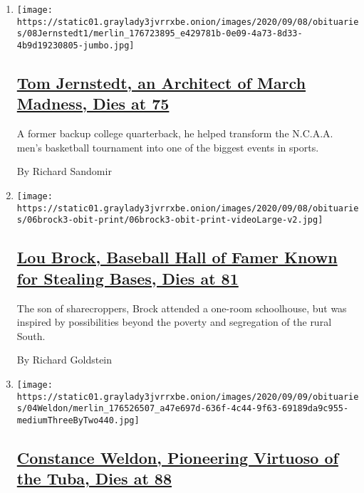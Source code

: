 \begin{enumerate}
\def\labelenumi{\arabic{enumi}.}
\item
  \texttt{[image: https://static01.graylady3jvrrxbe.onion/images/2020/09/08/obituaries/08Jernstedt1/merlin\_176723895\_e429781b-0e09-4a73-8d33-4b9d19230805-jumbo.jpg]}

  \hypertarget{tom-jernstedt-an-architect-of-march-madness-dies-at-75}{%
  \subsection{\texorpdfstring{\href{/2020/09/08/sports/ncaabasketball/tom-jernstedt-dead.html}{Tom
  Jernstedt, an Architect of March Madness, Dies at
  75}}{Tom Jernstedt, an Architect of March Madness, Dies at 75}}\label{tom-jernstedt-an-architect-of-march-madness-dies-at-75}}

  A former backup college quarterback, he helped transform the N.C.A.A.
  men's basketball tournament into one of the biggest events in sports.

  By Richard Sandomir
\item
  \texttt{[image: https://static01.graylady3jvrrxbe.onion/images/2020/09/08/obituaries/06brock3-obit-print/06brock3-obit-print-videoLarge-v2.jpg]}

  \hypertarget{lou-brock-baseball-hall-of-famer-known-for-stealing-bases-dies-at-81}{%
  \subsection{\texorpdfstring{\href{/2020/09/06/sports/baseball/lou-brock-dead.html}{Lou
  Brock, Baseball Hall of Famer Known for Stealing Bases, Dies at
  81}}{Lou Brock, Baseball Hall of Famer Known for Stealing Bases, Dies at 81}}\label{lou-brock-baseball-hall-of-famer-known-for-stealing-bases-dies-at-81}}

  The son of sharecroppers, Brock attended a one-room schoolhouse, but
  was inspired by possibilities beyond the poverty and segregation of
  the rural South.

  By Richard Goldstein
\item
  \texttt{[image: https://static01.graylady3jvrrxbe.onion/images/2020/09/09/obituaries/04Weldon/merlin\_176526507\_a47e697d-636f-4c44-9f63-69189da9c955-mediumThreeByTwo440.jpg]}

  \hypertarget{constance-weldon-pioneering-virtuoso-of-the-tuba-dies-at-88}{%
  \subsection{\texorpdfstring{\href{/2020/09/07/arts/music/constance-weldon-dead.html}{Constance
  Weldon, Pioneering Virtuoso of the Tuba, Dies at
  88}}{Constance Weldon, Pioneering Virtuoso of the Tuba, Dies at 88}}\label{constance-weldon-pioneering-virtuoso-of-the-tuba-dies-at-88}}


\end{enumerate}

